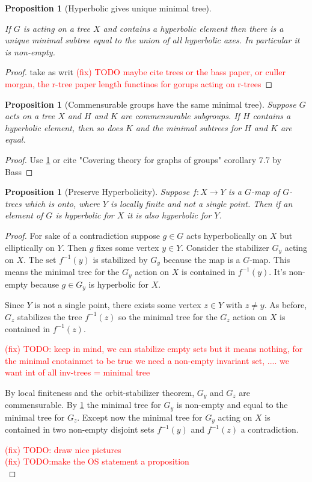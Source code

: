 \documentclass{article}
\newcommand{\fix}[1]{\textcolor{red}{(fix) #1}}
\theoremstyle{mystyle}
\newtheorem{pro}[thm]{Proposition}
\theoremstyle{remark}
\begin{document}
\begin{pro}
    [Hyperbolic gives unique minimal tree]
    \label{pro:uniquemintree}
    
    If $G$ is acting on a tree $X$ and contains a hyperbolic element then there is a unique minimal subtree equal to the union of all hyperbolic axes. In particular it is non-empty.
\end{pro}
\begin{proof}
    take as writ \fix{TODO maybe cite trees or the bass paper, or culler morgan, the r-tree paper length functinos for gorups acting on r-trees}
\end{proof}
\begin{pro}
    [Commensurable groups have the same minimal tree]
    \label{pro:commintree}
    Suppose $G$ acts on a tree $X$ and $H$ and $K$ are commensurable subgroups. If $H$ contains a hyperbolic element, then so does $K$ and the minimal subtrees for $H$ and $K$ are equal.
\end{pro}
\begin{proof}
    Use \ref{pro:uniquemintree} or cite "Covering theory for graphs of groups" corollary 7.7 by Bass
\end{proof}

\begin{pro}
    [Preserve Hyperbolicity]
    \label{pro:preservehyperbolicity}
    Suppose $f: X\to Y$ is a $G$-map of $G$-trees which is onto, where $Y$ is locally finite and not a single point. Then if an element of $G$ is hyperbolic for $X$ it is also hyperbolic for $Y$.
\end{pro}
\begin{proof}

For sake of a contradiction suppose $g\in G$ acts hyperbolically on $X$ but elliptically on $Y$.  Then $g$ fixes some vertex $y\in Y$.  Consider the stabilizer $G_y$ acting on $X$. The set $f^{-1}(y)$ is stabilized by $G_y$ because the map is a $G$-map. This means the minimal tree for the $G_y$ action on $X$ is contained in $f^{-1}(y)$. It's non-empty because $g\in G_y$ is hyperbolic for $X$.


Since $Y$ is not a single point, there exists some vertex $z\in Y$ with $z\neq y$. As before, $G_z$ stabilizes the tree $f^{-1}(z)$ so the minimal tree for the $G_z$ action on $X$ is contained in $f^{-1}(z)$.

\fix{TODO: keep in mind, we can stabilize empty sets but it means nothing, for the minimal cnotainmet to be true we need a non-empty invariant set, .... we want int of all inv-trees = minimal tree}

By local finiteness and the orbit-stabilizer theorem, $G_y$ and $G_z$ are commensurable. By \ref{pro:commintree} the minimal tree for $G_y$ is non-empty and equal to the minimal tree for $G_z$. Except now the minimal tree for $G_y$ acting on $X$ is contained in two non-empty disjoint sets $f^{-1}(y)$ and $f^{-1}(z)$ a contradiction.

\fix{TODO: draw nice pictures}\\
\fix{TODO:make the OS statement a proposition}\\

\end{proof}
\end{document}
